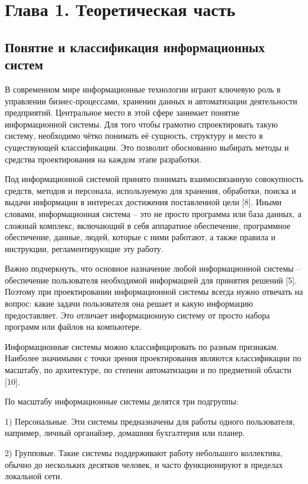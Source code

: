 \documentclass[14pt,a4paper]{extarticle}
\begin{document}
\newpage
{}
\section*{Глава 1. Теоретическая часть}

\subsection{Понятие и классификация информационных систем}

В современном мире информационные технологии играют ключевую роль в
управлении бизнес-процессами, хранении данных и автоматизации
деятельности предприятий. Центральное место в этой сфере занимает
понятие информационной системы. Для того чтобы грамотно спроектировать
такую систему, необходимо чётко понимать её сущность, структуру и место
в существующей классификации. Это позволит обоснованно выбирать методы и
средства проектирования на каждом этапе разработки.

Под информационной системой принято понимать взаимосвязанную
совокупность средств, методов и персонала, используемую для хранения,
обработки, поиска и выдачи информации в интересах достижения
поставленной цели [8]. Иными словами, информационная система -- это
не просто программа или база данных, а сложный комплекс, включающий в
себя аппаратное обеспечение, программное обеспечение, данные, людей,
которые с ними работают, а также правила и инструкции, регламентирующие
эту работу.

Важно подчеркнуть, что основное назначение любой информационной системы
-- обеспечение пользователя необходимой информацией для принятия решений
[5]. Поэтому при проектировании информационной системы всегда нужно
отвечать на вопрос: какие задачи пользователя она решает и какую
информацию предоставляет. Это отличает информационную систему от просто
набора программ или файлов на компьютере.

Информационные системы можно классифицировать по разным признакам.
Наиболее значимыми с точки зрения проектирования являются классификации
по масштабу, по архитектуре, по степени автоматизации и по предметной
области [10].

По масштабу информационные системы делятся три подгруппы:

1) Персональные. Эти системы предназначены для работы одного
пользователя, например, личный органайзер, домашняя бухгалтерия или
планер.

2) Групповые. Такие системы поддерживают работу небольшого коллектива,
обычно до нескольких десятков человек, и часто функционируют в пределах
локальной сети.
\end{document}
